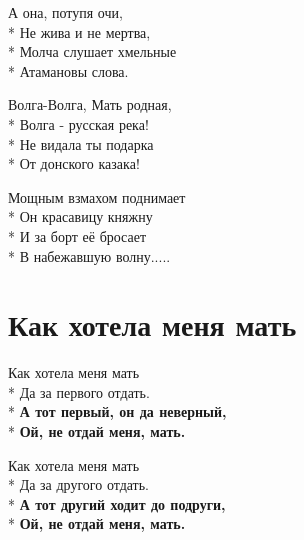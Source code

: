 \medskip

\begin{minipage}{\linewidth}
А она, потупя очи,\\*
Не жива и не мертва,\\*
Молча слушает хмельные\\*
Атамановы слова.\\
\end{minipage}\par\medskip\nobreak

\medskip

\begin{minipage}{\linewidth}
Волга-Волга, Мать родная,\\*
Волга - русская река!\\*
Не видала ты подарка\\*
От донского казака!\\
\end{minipage}\par\medskip\nobreak

\medskip

\begin{minipage}{\linewidth}
Мощным взмахом поднимает\\*
Он красавицу княжну\\*
И за борт её бросает\\*
В набежавшую волну.....\\
\end{minipage}

\vspace{\fill}\newpage

\section{Как хотела меня мать}
\label{song:Как_хотела_меня_мать}

\medskip

\begin{minipage}{\linewidth}
Как хотела меня мать\\*
Да за первого отдать.\\*
\textbf{А тот первый, он да неверный,}\\*
\textbf{Ой, не отдай меня, мать.}\\
\end{minipage}\par\medskip\nobreak

\medskip

\begin{minipage}{\linewidth}
Как хотела меня мать\\*
Да за другого отдать.\\*
\textbf{А тот другий ходит до подруги,}\\*
\textbf{Ой, не отдай меня, мать.}\\
\end{minipage}\par\medskip\nobreak

